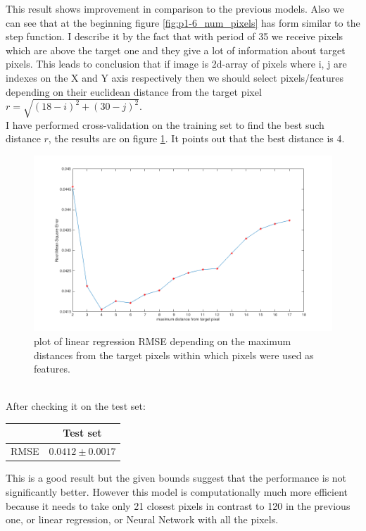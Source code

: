 \documentclass{article}
\begin{document}
			This result shows improvement in comparison to the previous models. Also we can see that at the beginning figure \ref{fig:p1-6_num_pixels} has form similar to the step function. I describe it by the fact that with period of 35 we receive pixels which are above the target one and they give a lot of information about target pixels. This leads to conclusion that if image is 2d-array of pixels where i, j are indexes on the X and Y axis respectively then we should select pixels/features depending on their euclidean distance from the target pixel $r = \sqrt{(18 - i)^2 + (30 - j)^2}$. \\
			 I have performed cross-validation on the training set to find the best such distance $r$, the results are on figure \ref{fig:p1-6_closest_pixels}. It points out that the best distance is 4.
 		 	\begin{figure}[htbp]
 		 		\centering
 		 		\includegraphics[width=16cm]{images/p1-6_closest_pixels.png}
 		 		\caption{plot of linear regression RMSE depending on the maximum distances from the target pixels within which pixels were  used as features.}
 		 		\label{fig:p1-6_closest_pixels}	
 		 	\end{figure}
 		 	\\
			 After checking it on the test set:
			\begin{center}
				\begin{tabular}{| c | c |}
					\hline
					\, &  Test set \\ \hline
					RMSE & $0.0412 \pm 0.0017$ \\ 
					\hline
				\end{tabular}
			\end{center}
			This is a good result but the given bounds suggest that the performance is not significantly better. However this model is computationally much more efficient because it needs to take only 21 closest pixels in contrast to 120 in the previous one, or linear regression, or Neural Network with all the pixels. \\ 
\end{document}
